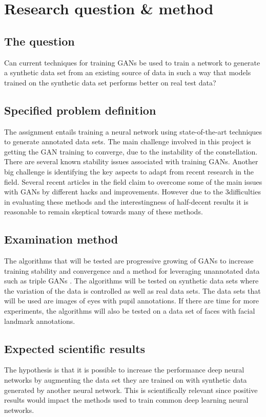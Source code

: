 \documentclass[a4paper]{article}
\begin{document}
\section{Research question \& method}
\subsection{The question}
Can current techniques for training GANs be used to train a network to generate a synthetic data set from
an existing source of data in such a way that models trained on the synthetic data set performs better on
real test data?

\subsection{Specified problem definition}
The assignment entails training a neural network using state-of-the-art techniques to generate annotated data sets. The main challenge involved in this project is getting the GAN training to converge, due to the instability of the constellation. There are several known stability issues associated with training GANs. Another big challenge is identifying the key aspects to adapt from recent research in the field. Several recent articles in the field claim to overcome some of the main issues with GANs by different hacks and improvements. However due to the 3difficulties in evaluating these methods and the interestingness of half-decent results it is reasonable to remain skeptical towards many of these methods.

\subsection{Examination method}
The algorithms that will be tested are progressive growing of GANs \cite{karras2017progressive} to increase training stability and convergence and a method for leveraging unannotated data such as triple GANs \cite{li2017triple}. The algorithms will be tested on synthetic data sets where the variation of the data is controlled as well as real data sets. The data sets that will be used are images of eyes with pupil annotations. If there are time for more experiments, the algorithms will also be tested on a data set of faces with facial landmark annotations.

\subsection{Expected scientific results}
The hypothesis is that it is possible to increase the performance deep neural networks by augmenting the data set they are trained on with synthetic data generated by another neural network. 
This is scientifically relevant since positive results would impact the methods used to train common deep learning neural networks. 
\end{document}
